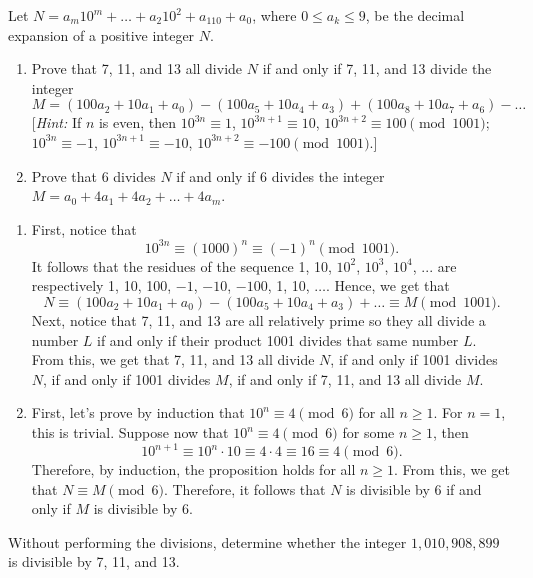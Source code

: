 \begin{exercise}
    Let $N = a_m10^m + \dots + a_2 10^2 + a_110 + a_0$, where $0 \leq a_k \leq 9$, be the decimal expansion of a positive integer $N$.
    \begin{enumerate}
        \item Prove that 7, 11, and 13 all divide $N$ if and only if 7, 11, and 13 divide the integer
        $$M = (100a_2 + 10a_1 + a_0) - (100a_5 + 10a_4 + a_3) + (100a_8 + 10a_7 + a_6) - \dots$$
        [\textit{Hint:} If $n$ is even, then $10^{3n} \equiv 1$, $10^{3n+1} \equiv 10$, $10^{3n+2} \equiv 100 \pmod{1001}$; $10^{3n} \equiv -1$, $10^{3n+1} \equiv -10$, $10^{3n+2} \equiv -100 \pmod{1001}$.]
        \item Prove that 6 divides $N$ if and only if 6 divides the integer $M = a_0 + 4a_1 + 4a_2 + \dots + 4a_m$.
    \end{enumerate}
\end{exercise}

\begin{solution}
    \begin{enumerate}
        \item First, notice that
        $$10^{3n} \equiv (1000)^n \equiv (-1)^n \pmod{1001}.$$
        It follows that the residues of the sequence 1, 10, $10^2$, $10^3$, $10^4$, ... are respectively 1, 10, 100, $-1$, $-10$, $-100$, 1, 10, $\dots$. Hence, we get that
        $$N \equiv (100a_2 + 10a_1 + a_0) - (100a_5 + 10a_4 + a_3) + \dots \equiv M \pmod{1001}.$$
        Next, notice that 7, 11, and 13 are all relatively prime so they all divide a number $L$ if and only if their product 1001 divides that same number $L$. From this, we get that 7, 11, and 13 all divide $N$, if and only if 1001 divides $N$, if and only if 1001 divides $M$, if and only if 7, 11, and 13 all divide $M$.
        \item First, let's prove by induction that $10^n \equiv 4 \pmod{6}$ for all $n \geq 1$. For $n = 1$, this is trivial. Suppose now that $10^n \equiv 4 \pmod{6}$ for some $n \geq 1$, then
        $$10^{n+1} \equiv 10^n \cdot 10 \equiv 4 \cdot 4 \equiv 16 \equiv 4 \pmod 6.$$
        Therefore, by induction, the proposition holds for all $n \geq 1$. From this, we get that $N \equiv M \pmod{6}$. Therefore, it follows that $N$ is divisible by 6 if and only if $M$ is divisible by 6.
    \end{enumerate}
\end{solution}

\begin{exercise}
    Without performing the divisions, determine whether the integer $1,010,908,899$ is divisible by 7, 11, and 13. \\
\end{exercise}

